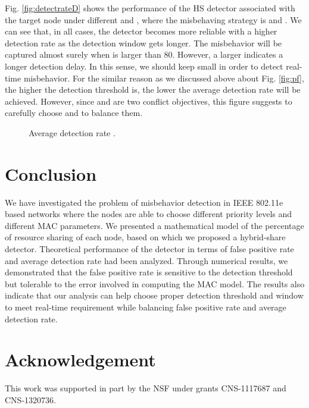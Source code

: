 \documentclass[conference]{IEEEtran}
\begin{document}
Fig. \ref{fig:detectrateD} shows the performance of the HS detector associated with the target node under different  and , where the misbehaving strategy is  and . We can see that, in all cases, the detector becomes more reliable with a higher detection rate as the detection window gets longer. The misbehavior will be captured almost surely when  is larger than 80. However, a larger  indicates a longer detection delay. In this sense, we should keep  small in order to detect real-time misbehavior. For the similar reason as we discussed above about Fig. \ref{fig:pf}, the higher the detection threshold is, the lower the average detection rate will be achieved. However, since  and  are two conflict objectives, this figure suggests to carefully choose  and  to balance them.

\begin{figure}[htbp]
\centering
\vspace{-1mm}
\caption{Average detection rate .}\label{fig:pd}
\vspace{-4mm}
\end{figure}


\section{Conclusion}\label{sec:conclusion}
We have investigated the problem of misbehavior detection in IEEE 802.11e based networks where the nodes are able to choose different priority levels and different MAC parameters. We presented a mathematical model of the percentage of resource sharing of each node, based on which we proposed a hybrid-share detector. Theoretical performance of the detector in terms of false positive rate and average detection rate had been analyzed. Through numerical results, we demonstrated that the false positive rate is sensitive to the detection threshold but tolerable to the error involved in computing the MAC model. The results also indicate that our analysis can help choose proper detection threshold and window to meet real-time requirement while balancing false positive rate and average detection rate.

\section*{Acknowledgement}
This work was supported in part by the NSF under grants CNS-1117687 and CNS-1320736.



\end{document}
